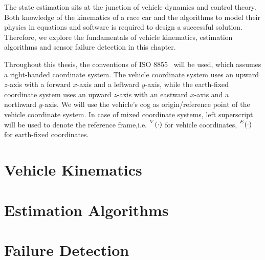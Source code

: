 The state estimation sits at the junction of vehicle dynamics and control theory. Both knowledge of the kinematics of a race car and the algorithms to model their physics in equations and software is required to design a successful solution. Therefore, we explore the fundamentals of vehicle kinematics, estimation algorithms and sensor failure detection in this chapter.

Throughout this thesis, the conventions of ISO 8855~\cite{ISO.2011} will be used, which assumes a right-handed coordinate system. The vehicle coordinate system uses an upward $z$-axis with a forward $x$-axis and a leftward $y$-axis, while the earth-fixed coordinate system uses an upward $z$-axis with an eastward $x$-axis and a northward $y$-axis. We will use the vehicle's \gls{cog} as origin/reference point of the vehicle coordinate system. In case of mixed coordinate systems, left superscript will be used to denote the reference frame,i.e. $\prescript{V}{}{(\cdot)}$ for vehicle coordinates, $\prescript{E}{}{(\cdot)}$ for earth-fixed coordinates.

\section{Vehicle Kinematics}


\section{Estimation Algorithms}


\section{Failure Detection}

